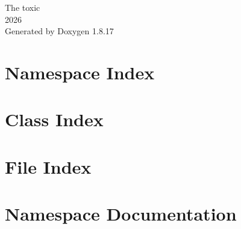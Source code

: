 \let\mypdfximage\pdfximage\def\pdfximage{\immediate\mypdfximage}\documentclass[twoside]{book}
\newcommand{\+}{\discretionary{\mbox{\scriptsize$\hookleftarrow$}}{}{}}
\newcommand{\clearemptydoublepage}{%
  \newpage{\pagestyle{empty}\cleardoublepage}%
}
\begin{document}
\hypersetup{pageanchor=false,
             bookmarksnumbered=true,
             pdfencoding=unicode
            }
\begin{titlepage}
\vspace*{7cm}
\begin{center}%
{\Large The toxic \\[1ex]\large 2026 }\\
\vspace*{1cm}
{\large Generated by Doxygen 1.8.17}\\
\end{center}
\end{titlepage}
\clearemptydoublepage
{}
\tableofcontents
\clearemptydoublepage
{}
\hypersetup{pageanchor=true}

\chapter{Namespace Index}

\chapter{Class Index}

\chapter{File Index}

\chapter{Namespace Documentation}



















































\end{document}
